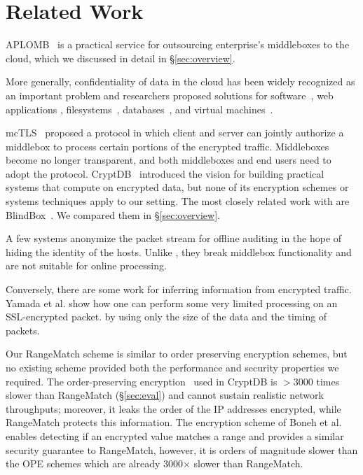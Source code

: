 
\section{Related Work}
\label{sec:related}

APLOMB~\cite{aplomb} is a practical service for outsourcing enterprise's middleboxes to the cloud, which we discussed in detail in \S\ref{sec:overview}.

More generally, confidentiality of data in the cloud has been widely recognized as an important problem and researchers proposed solutions for software~\cite{Baumann:Haven}, web applications \cite{giffin:hails, Mylar},  filesystems~\cite{blaze:cfs, kallahalla:plutus, goh:sirius},  databases~\cite{popa:cryptdb},  and virtual machines~\cite{Zhang:CloudVisor}. 

mcTLS~\cite{mctls} proposed a protocol in which client and server can jointly authorize a middlebox to process certain portions of the encrypted traffic. Middleboxes become no longer transparent, and both middleboxes and end users need to adopt the protocol. CryptDB~\cite{popa:cryptdb} introduced the vision for building practical systems that compute on encrypted data, but none of its encryption schemes or systems techniques apply to our setting. The most closely related work with \sys are BlindBox~\cite{blindbox}. We compared them in \S\ref{sec:overview}.

A few systems \cite{Vern:Anonymize06, Vern:Anonymize03} anonymize the packet stream for offline auditing in the hope of hiding the identity of the hosts. Unlike \sys, they break middlebox functionality and are not suitable for online processing. 

Conversely, there are some work for inferring information from encrypted traffic. Yamada et al.\cite{Yamada_IDS} show how one can perform some very limited processing on an SSL-encrypted packet. by using only the size of the data and the timing of packets.

Our RangeMatch scheme is similar to order preserving encryption schemes, but no existing scheme provided both the performance and security properties we required.
The order-preserving encryption~\cite{boldyreva:ope, popa:mope} used in CryptDB is 
 $>3000$ times slower than RangeMatch (\S\ref{sec:eval}) and cannot sustain realistic network throughputs; moreover, it leaks the order of the IP addresses encrypted, while RangeMatch protects this information. 
The encryption scheme of Boneh et al.~\cite{BonehRange} enables detecting if an encrypted value matches a range and provides a similar security guarantee to RangeMatch, however, it is orders of magnitude slower than the OPE schemes which are already 3000$\times$ slower than RangeMatch. 

